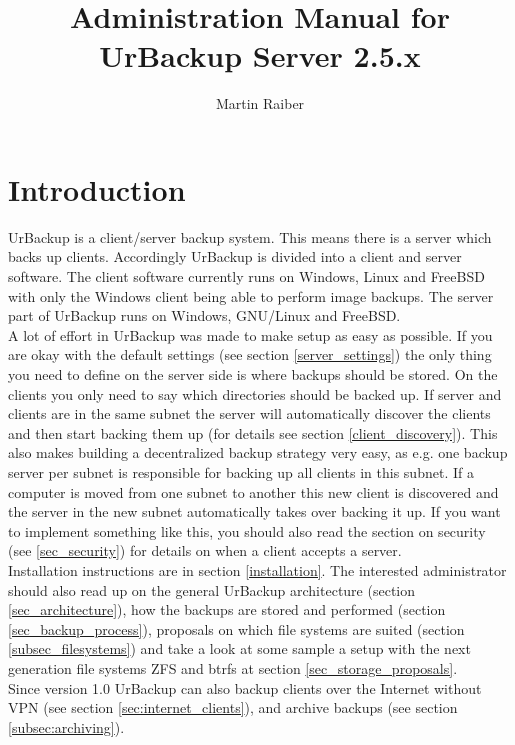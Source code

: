 \documentclass[a4paper,10pt]{article}
\begin{document}

\author{Martin Raiber}
\title{Administration Manual for\\UrBackup Server 2.5.x}

\maketitle

\tableofcontents

\newpage

\section{Introduction}

UrBackup is a client/server backup system. This means there is a server
which backs up clients. Accordingly UrBackup is divided into a client and server
software.
The client software currently runs on Windows, Linux and FreeBSD with only
the Windows client being able to perform image backups. 
The server part of UrBackup runs on Windows, GNU/Linux and FreeBSD.\\
A lot of effort in UrBackup was made to make setup as easy as possible. If you
are okay with the default settings (see section \ref{server_settings}) the only
thing you need to define on the server side is where backups should be stored.
On the clients you only need to say which directories should be backed up. If
server and clients are in the same subnet the server will automatically discover
the clients and then start backing them up (for details see section
\ref{client_discovery}). This also makes building a decentralized backup
strategy very easy, as e.g. one backup server per subnet is responsible for
backing up all clients in this subnet. If a computer is moved from one subnet to
another this new client is discovered and the server in the new subnet
automatically takes over backing it up. If you want to implement something like
this, you should also read the section on security (see \ref{sec_security}) for
details on when a client accepts a server.\\
Installation instructions are in section \ref{installation}.
The interested administrator should also read up on the general UrBackup architecture
(section \ref{sec_architecture}), how the backups are stored and performed
(section \ref{sec_backup_process}), proposals on which file systems are suited
(section \ref{subsec_filesystems}) and take a look at some sample a setup with
the next generation file systems ZFS and btrfs at section \ref{sec_storage_proposals}.\\
Since version 1.0 UrBackup can also backup clients over the Internet without VPN (see section
\ref{sec:internet_clients}), and archive backups (see section \ref{subsec:archiving}).
\end{document}
